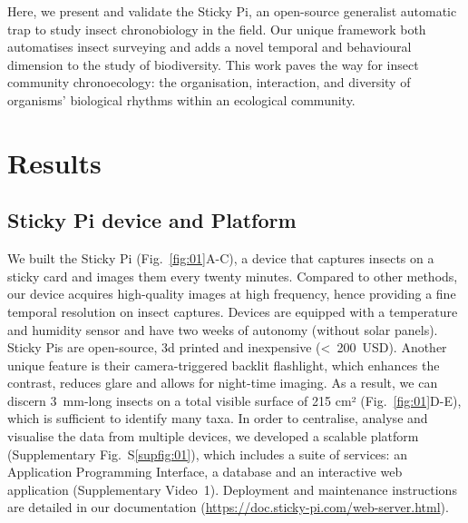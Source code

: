 \documentclass[12pt]{article}
\begin{document}
\begin{linenumbers}
		Here, we present and validate the Sticky Pi, an open-source generalist automatic trap to study insect chronobiology in the field. Our unique framework both automatises insect surveying and adds a novel temporal and behavioural dimension to the study of biodiversity. This work paves the way for insect community chronoecology: the organisation, interaction, and diversity of organisms’ biological rhythms within an ecological community. 

		
		
		\section*{Results}

		\subsection*{Sticky Pi device and Platform}

		We built the Sticky Pi (Fig.~\ref{fig:01}A-C), a device that captures insects on a sticky card and images them every twenty minutes. Compared to other methods, our device acquires high-quality images at high frequency, hence providing a fine temporal resolution on insect captures. Devices are equipped with a temperature and humidity sensor and have two weeks of autonomy (without solar panels). Sticky Pis are open-source, 3d printed and inexpensive (<~200~USD). Another unique feature is their camera-triggered backlit flashlight, which enhances the contrast, reduces glare and allows for night-time imaging. As a result, we can discern 3~mm-long insects on a total visible surface of 215 cm² (Fig.~\ref{fig:01}D-E), which is sufficient to identify many taxa. In order to centralise, analyse and visualise the data from multiple devices, we developed a scalable platform (Supplementary Fig.~S\ref{supfig:01}), which includes a suite of services: an Application Programming Interface, a database and an interactive web application (Supplementary Video~1). Deployment and maintenance instructions are detailed in our documentation (\href{https://doc.sticky-pi.com/web-server.html}{https://doc.sticky-pi.com/web-server.html}).


\end{linenumbers}
\end{document}
